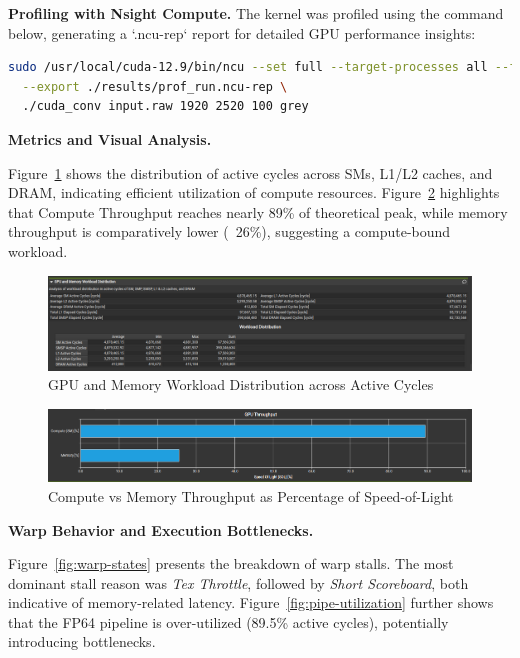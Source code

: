 \documentclass[conference, 10pt]{IEEEtran}
\begin{document}
\textbf{Profiling with Nsight Compute.}  
The kernel was profiled using the command below, generating a `.ncu-rep` report for detailed GPU performance insights:

\begin{lstlisting}[language=bash, caption={Nsight Compute Profiling Command}]
sudo /usr/local/cuda-12.9/bin/ncu --set full --target-processes all --force-overwrite \
  --export ./results/prof_run.ncu-rep \
  ./cuda_conv input.raw 1920 2520 100 grey
\end{lstlisting}

\textbf{Metrics and Visual Analysis.}

Figure~\ref{fig:workload-distribution} shows the distribution of active cycles across SMs, L1/L2 caches, and DRAM, indicating efficient utilization of compute resources.  
Figure~\ref{fig:gpu-throughput} highlights that Compute Throughput reaches nearly 89\% of theoretical peak, while memory throughput is comparatively lower (~26\%), suggesting a compute-bound workload.

\vspace{1em}

\begin{figure}[H]
    \centering
    \includegraphics[width=0.95\linewidth]{figures/WorkloadDistribution.png}
    \caption{GPU and Memory Workload Distribution across Active Cycles}
    \label{fig:workload-distribution}
\end{figure}

\begin{figure}[H]
    \centering
    \includegraphics[width=0.9\linewidth]{figures/GPU_Throughput.png}
    \caption{Compute vs Memory Throughput as Percentage of Speed-of-Light}
    \label{fig:gpu-throughput}
\end{figure}

\textbf{Warp Behavior and Execution Bottlenecks.}

Figure~\ref{fig:warp-states} presents the breakdown of warp stalls. The most dominant stall reason was \textit{Tex Throttle}, followed by \textit{Short Scoreboard}, both indicative of memory-related latency.  
Figure~\ref{fig:pipe-utilization} further shows that the FP64 pipeline is over-utilized (89.5\% active cycles), potentially introducing bottlenecks.
\end{document}
